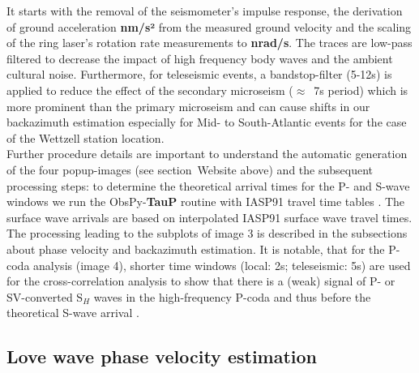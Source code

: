 \documentclass[12pt,reqno,letter]{article}
\begin{document}
It starts with the removal of the seismometer’s impulse response, the derivation of ground acceleration \textbf{nm/s²} from the measured ground velocity and the scaling of the ring laser's rotation rate measurements to \textbf{nrad/s}. The traces are low-pass filtered to decrease the impact of high frequency body waves and the ambient cultural noise. Furthermore, for teleseismic events, a bandstop-filter (5-12s) is applied to reduce the effect of the secondary microseism ($\approx$~7s period) which is more prominent than the primary microseism \citep{Hadziioannou2012} and can cause shifts in our backazimuth estimation especially for Mid- to South-Atlantic events for the case of the Wettzell station location.\\
Further procedure details are important to understand the automatic generation of the four popup-images (see section~Website above) and the subsequent processing steps: 
to determine the theoretical arrival times for the P- and S-wave windows we run the ObsPy-\textbf{TauP} routine with IASP91 travel time tables \citep{Kennett1991}. The surface wave arrivals are  based on interpolated IASP91 surface wave travel times. The processing leading to the subplots of image 3 is described in the subsections about phase velocity and backazimuth estimation.
It is notable, that for the P-coda analysis (image 4), shorter time windows (local: 2s; teleseismic: 5s) are used for the cross-correlation analysis to show that there is a (weak) signal of P- or SV-converted S$_H$ waves in the high-frequency P-coda and thus before the theoretical S-wave arrival \citep{Pham2009}.

%
\subsection*{Love wave phase velocity estimation}
\label{subsec:pv}
\end{document}
